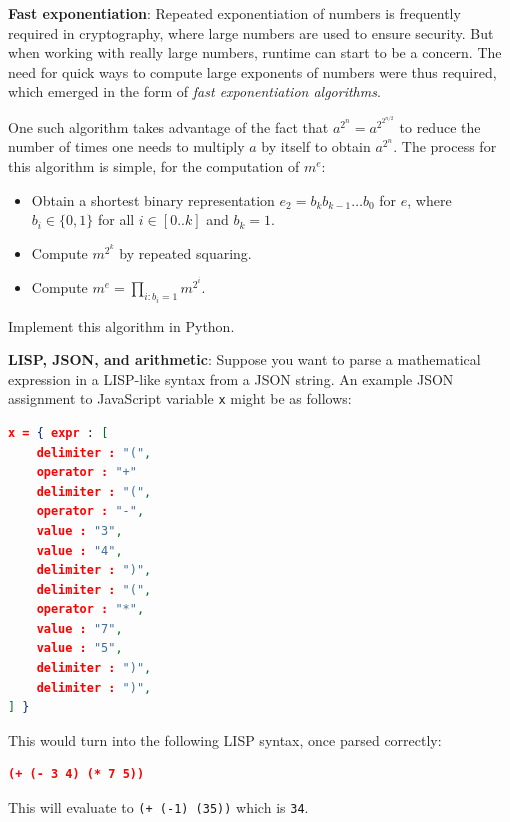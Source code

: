 \documentclass[addpoints]{exam}
\begin{document}
\begin{questions}

\question[15] \textbf{Fast exponentiation}: Repeated exponentiation of numbers is frequently required in cryptography, where large numbers are used to ensure security. But when working with really large numbers, runtime can start to be a concern. The need for quick ways to compute large exponents of numbers were thus required, which emerged in the form of \emph{fast exponentiation algorithms}. 

One such algorithm takes advantage of the fact that $a^{2^n} = a^{2^{2^{n/2}}}$ to reduce the number of times one needs to multiply $a$ by itself to obtain $a^{2^n}$. The process for this algorithm is simple, for the computation of $m^e$:

\begin{itemize}
    \item Obtain a shortest binary representation $e_2 = b_k b_{k-1} \dots b_0$ for $e$, where $b_i \in \{0,1\}$ for all $i \in [0..k]$ and $b_k = 1$.
    \item Compute $m^{2^k}$ by repeated squaring.
    \item Compute $m^e = \prod_{i : b_i = 1} m^{2^i}$. 
\end{itemize} 

Implement this algorithm in Python.

\newpage

\question[20] \textbf{LISP, JSON, and arithmetic}: Suppose you want to parse a mathematical expression in a LISP-like syntax from a JSON string. An example JSON assignment to JavaScript variable \texttt{x} might be as follows:

\begin{lstlisting}[language=json,firstnumber=1]
x = { expr : [ 
    delimiter : "(",
    operator : "+"
    delimiter : "(",
    operator : "-",
    value : "3", 
    value : "4",
    delimiter : ")",
    delimiter : "(",
    operator : "*",
    value : "7",
    value : "5",
    delimiter : ")",
    delimiter : ")",
] }
\end{lstlisting}

This would turn into the following LISP syntax, once parsed correctly:

\begin{lstlisting}[language=json]
(+ (- 3 4) (* 7 5))
\end{lstlisting}

This will evaluate to \texttt{(+ (-1) (35))} which is \texttt{34}. 


\end{questions}
\end{document}
